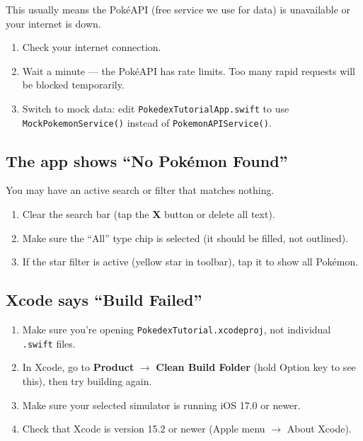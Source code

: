 \documentclass[11pt,a4paper]{article}
\newenvironment{tightenumerate}
{\begin{enumerate}\setlength{\itemsep}{2pt}\setlength{\parskip}{0pt}}
{\end{enumerate}}
\begin{document}
This usually means the Pok\'{e}API (free service we use for data) is unavailable or your internet is down.

\begin{tightenumerate}
    \item Check your internet connection.
    \item Wait a minute — the Pok\'{e}API has rate limits. Too many rapid requests will be blocked temporarily.
    \item Switch to mock data: edit \texttt{PokedexTutorialApp.swift} to use \texttt{MockPokemonService()} instead of \texttt{PokemonAPIService()}.
\end{tightenumerate}

\subsection{The app shows ``No Pok\'{e}mon Found''}

You may have an active search or filter that matches nothing.

\begin{tightenumerate}
    \item Clear the search bar (tap the \textbf{X} button or delete all text).
    \item Make sure the ``All'' type chip is selected (it should be filled, not outlined).
    \item If the star filter is active (yellow star in toolbar), tap it to show all Pok\'{e}mon.
\end{tightenumerate}

\subsection{Xcode says ``Build Failed''}

\begin{tightenumerate}
    \item Make sure you're opening \texttt{PokedexTutorial.xcodeproj}, not individual \texttt{.swift} files.
    \item In Xcode, go to \textbf{Product} $\rightarrow$ \textbf{Clean Build Folder} (hold Option key to see this), then try building again.
    \item Make sure your selected simulator is running iOS 17.0 or newer.
    \item Check that Xcode is version 15.2 or newer (Apple menu $\rightarrow$ About Xcode).
\end{tightenumerate}
\end{document}

